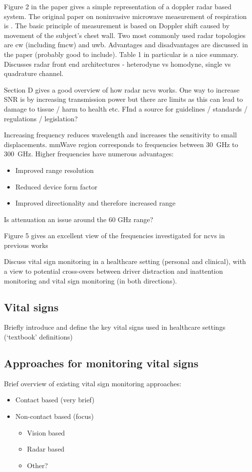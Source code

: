 \documentclass[11pt, parskip=half*,twoside=false]{scrbook}
\begin{document}
Figure 2 in the paper gives a simple representation of a doppler radar based system. The original paper on noninvasive microwave measurement of respiration is  \citep{linNoninvasiveMicrowaveMeasurement1975}. The basic principle of measurement is based on Doppler shift caused by movement of the subject's chest wall.  Two most commonly used radar topologies are \gls{cw} (including \gls{fmcw}) and \gls{uwb}. Advantages and disadvantages are discussed in the paper (probably good to include). Table 1 in particular is a nice summary. Discusses radar front end architectures - heterodyne vs homodyne, single vs quadrature channel.

Section D gives a good overview of how radar \gls{ncvs} works. One way to increase SNR is by increasing transmission power but there are limits as this can lead to damage to tissue / harm to health etc. FInd a source for guidelines / standards / regulations / legislation?

Increasing frequency reduces wavelength and increases the sensitivity to small displacements. mmWave region corresponds to frequencies between 30~GHz to 300~GHz.  Higher frequencies have numerous advantages:
\begin{itemize}
	\item Improved range resolution
	\item Reduced device form factor
	\item Improved directionality and therefore increased range
\end{itemize}

Is attenuation an issue around the 60 GHz range?

Figure 5 gives an excellent view of the frequencies investigated for \gls{ncvs} in previous works


Discuss vital sign monitoring in a healthcare setting (personal and clinical), with a view to potential cross-overs between driver distraction and inattention monitoring and vital sign monitoring (in both directions).
\subsection{Vital signs} \label{ssec:vital_signs}
Briefly introduce and define the key vital signs used in healthcare settings (`textbook' definitions)
\subsection{Approaches for monitoring vital signs}
Brief overview of existing vital sign monitoring approaches:
\begin{itemize}
	\item Contact based (very brief)
	\item Non-contact based (focus)
	\begin{itemize}
		\item Vision based
		\item Radar based
		\item Other?
	\end{itemize}
\end{itemize}
\end{document}
